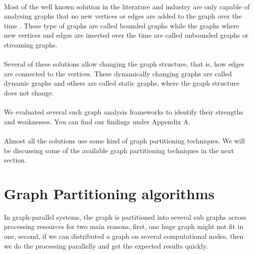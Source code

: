 \documentclass[12pt]{report}
\numberwithin{figure}{section}
\numberwithin{table}{section}
\begin{document}
\paragraph{}

Most of the well known solution in the literature and industry are only capable of analysing graphs that no new vertices or edges are added to the graph over the time\cite{Pregel} \cite{Graphlab}. These type of graphs are called bounded graphs while the graphs where new vertices and edges are inserted  over the time are called unbounded graphs or streaming graphs\cite{Fennel}\cite{S-PowerGraph}. 

\paragraph{}

Several of these solutions allow changing the graph structure, that is, how edges are connected to the vertices. These dynamically changing graphs are called dynamic graphs and others are called static graphs, where the graph structure does not change\cite{X-stream}.

\paragraph{}

We evaluated several such graph analysis frameworks to identify their strengths and weaknesses. You can find our findings under Appendix A.

\paragraph{}

Almost all the solutions use some kind of graph partitioning techniques. We will be discussing some of the available graph partitioning techniques in the next section.  

\section{Graph Partitioning algorithms}
In graph-parallel systems, the graph is partitioned into several sub graphs across processing resources for two main reasons, first, one huge graph might not fit in one, second, if we can distributed a graph on several computational nodes, then we do the processing parallelly and get the expected results quickly.  

\paragraph{}
\end{document}
